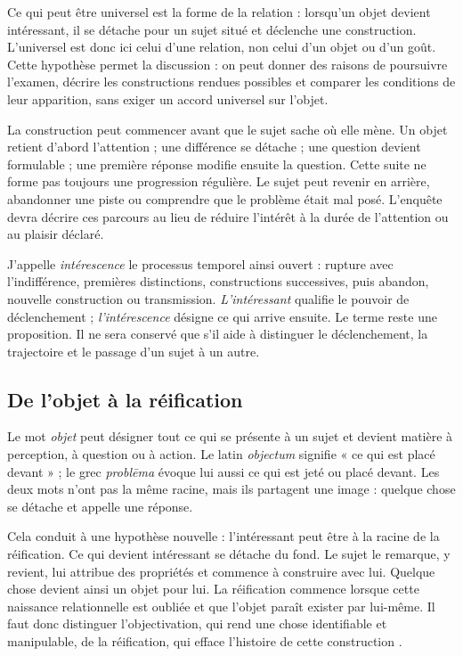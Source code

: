 \documentclass[11pt,a4paper]{article}
\begin{document}
Ce qui peut être universel est la forme de la relation : lorsqu'un objet devient
intéressant, il se détache pour un sujet situé et déclenche une construction.
L'universel est donc ici celui d'une relation, non celui d'un objet ou d'un goût.
Cette hypothèse permet la discussion : on peut donner des raisons de poursuivre
l'examen, décrire les constructions rendues possibles et comparer les conditions
de leur apparition, sans exiger un accord universel sur l'objet.

La construction peut commencer avant que le sujet sache où elle mène. Un objet
retient d'abord l'attention ; une différence se détache ; une question devient
formulable ; une première réponse modifie ensuite la question. Cette suite ne
forme pas toujours une progression régulière. Le sujet peut revenir en arrière,
abandonner une piste ou comprendre que le problème était mal posé. L'enquête
devra décrire ces parcours au lieu de réduire l'intérêt à la durée de
l'attention ou au plaisir déclaré.

J'appelle \emph{intérescence} le processus temporel ainsi ouvert : rupture avec
l'indifférence, premières distinctions, constructions successives, puis
abandon, nouvelle construction ou transmission. \emph{L'intéressant} qualifie
le pouvoir de déclenchement ; \emph{l'intérescence} désigne ce qui arrive
ensuite. Le terme reste une proposition. Il ne sera conservé que s'il aide à
distinguer le déclenchement, la trajectoire et le passage d'un sujet à un autre.

\subsection{De l'objet à la réification}

Le mot \emph{objet} peut désigner tout ce qui se présente à un sujet et devient
matière à perception, à question ou à action. Le latin \emph{objectum} signifie
« ce qui est placé devant » ; le grec \emph{problēma} évoque lui aussi ce qui
est jeté ou placé devant. Les deux mots n'ont pas la même racine, mais ils
partagent une image : quelque chose se détache et appelle une réponse.

Cela conduit à une hypothèse nouvelle : l'intéressant peut être à la racine de
la réification. Ce qui devient intéressant se détache du fond. Le sujet le
remarque, y revient, lui attribue des propriétés et commence à construire avec
lui. Quelque chose devient ainsi un objet pour lui. La réification commence
lorsque cette naissance relationnelle est oubliée et que l'objet paraît exister
par lui-même. Il faut donc distinguer l'objectivation, qui rend une chose
identifiable et manipulable, de la réification, qui efface l'histoire de cette
construction \parencite{pachet2004reification}.
\end{document}
